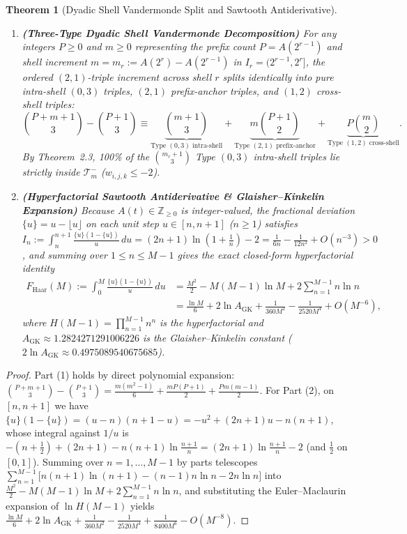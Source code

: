\documentclass[11pt,a4paper]{article}
\newtheorem{theorem}{Theorem}[section]
\theoremstyle{remark}
\begin{document}
\begin{theorem}[Dyadic Shell Vandermonde Split and Sawtooth Antiderivative]
\begin{enumerate}
  \item \textbf{(Three-Type Dyadic Shell Vandermonde Decomposition)} For any integers $P \ge 0$ and $m \ge 0$ representing the prefix count $P = A(2^{r-1})$ and shell increment $m = m_r := A(2^r) - A(2^{r-1})$ in $I_r = (2^{r-1}, 2^r]$, the ordered $(2,1)$-triple increment across shell $r$ splits identically into pure intra-shell $(0,3)$ triples, $(2,1)$ prefix-anchor triples, and $(1,2)$ cross-shell triples:
  \[
    \binom{P + m + 1}{3} - \binom{P + 1}{3} \equiv \underbrace{\binom{m + 1}{3}}_{\text{Type }(0,3)\text{ intra-shell}} + \underbrace{m \binom{P + 1}{2}}_{\text{Type }(2,1)\text{ prefix-anchor}} + \underbrace{P \binom{m}{2}}_{\text{Type }(1,2)\text{ cross-shell}}.
  \]
  By Theorem~2.3, 100\% of the $\binom{m_r + 1}{3}$ Type $(0,3)$ intra-shell triples lie strictly inside $\mathcal{T}_m^-$ ($w_{i,j,k} \le -2$).
  \item \textbf{(Hyperfactorial Sawtooth Antiderivative \& Glaisher--Kinkelin Expansion)} Because $A(t) \in \mathbb{Z}_{\ge 0}$ is integer-valued, the fractional deviation $\{u\} = u - \lfloor u \rfloor$ on each unit step $u \in [n, n+1]$ ($n \ge 1$) satisfies $I_n := \int_n^{n+1} \frac{\{u\}(1-\{u\})}{u}\,du = (2n+1)\ln(1 + \frac{1}{n}) - 2 = \frac{1}{6n} - \frac{1}{12n^2} + O(n^{-3}) > 0$, and summing over $1 \le n \le M - 1$ gives the exact closed-form hyperfactorial identity
  \begin{align*}
    F_{\mathrm{Haar}}(M) := \int_0^M \frac{\{u\}(1 - \{u\})}{u}\,du &= \frac{M^2}{2} - M(M - 1)\ln M + 2\sum_{n=1}^{M-1} n\ln n \\
    &= \frac{\ln M}{6} + 2\ln A_{\mathrm{GK}} + \frac{1}{360 M^2} - \frac{1}{2520 M^4} + O(M^{-6}),
  \end{align*}
  where $H(M-1) = \prod_{n=1}^{M-1} n^n$ is the hyperfactorial and $A_{\mathrm{GK}} \approx 1.2824271291006226$ is the Glaisher--Kinkelin constant ($2\ln A_{\mathrm{GK}} \approx 0.4975089540675685$).
\end{enumerate}
\end{theorem}

\begin{proof}
Part (1) holds by direct polynomial expansion: $\binom{P+m+1}{3} - \binom{P+1}{3} = \frac{m(m^2 - 1)}{6} + \frac{m P(P+1)}{2} + \frac{P m(m-1)}{2}$. For Part (2), on $[n, n+1]$ we have $\{u\}(1 - \{u\}) = (u - n)(n + 1 - u) = -u^2 + (2n + 1)u - n(n + 1)$, whose integral against $1/u$ is $-(n + \frac{1}{2}) + (2n + 1) - n(n + 1)\ln\frac{n+1}{n} = (2n + 1)\ln\frac{n+1}{n} - 2$ (and $\frac{1}{2}$ on $[0, 1]$). Summing over $n = 1, \dots, M-1$ by parts telescopes $\sum_{n=1}^{M-1} \bigl[n(n+1)\ln(n+1) - (n-1)n\ln n - 2n\ln n\bigr]$ into $\frac{M^2}{2} - M(M - 1)\ln M + 2\sum_{n=1}^{M-1} n\ln n$, and substituting the Euler--Maclaurin expansion of $\ln H(M - 1)$ yields $\frac{\ln M}{6} + 2\ln A_{\mathrm{GK}} + \frac{1}{360 M^2} - \frac{1}{2520 M^4} + \frac{1}{8400 M^6} - O(M^{-8})$.
\end{proof}
\end{document}
